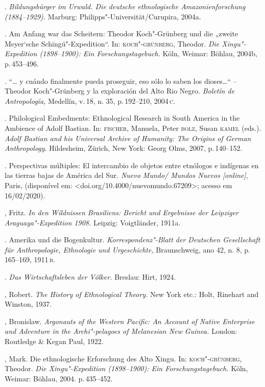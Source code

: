 \begin{bibliohedra}
 \titidem. \textit{Bildungsbürger im Urwald. Die deutsche
 ethnologische Amazonienforschung (1884--1929).} Marburg:
 Philipps"-Universität/Curupira, 2004a.

 \titidem. Am Anfang war das Scheitern: Theodor Koch"-Grünberg
 und die „zweite Meyer`sche Schingú"-Expedition``. In: \textsc{koch"-grünberg},
 Theodor. \textit{Die Xingu"-Expedition (1898--1900): Ein
 Forschungstagebuch.} Köln, Weimar: Böhlau, 2004b, p.\,453--496.

 \titidem. ``\ldots{} y cuándo finalmente pueda proseguir, eso
 sólo lo saben los dioses\ldots{}`` -- Theodor Koch"-Grünberg y la
 exploración del Alto Rio Negro. \textit{Boletín de Antropología,}
 Medellín, v.\,18, n. 35, p.\,192--210, 2004\,\textsc{c}.

 \titidem. Philological Embedments: Ethnological Research in
 South America in the Ambience of Adolf Bastian. In: \textsc{fischer}, Manuela,
 Peter \textsc{bolz}, Susan \textsc{kamel} (eds.). \textit{Adolf Bastian and his Universal
 Archive of Humanity: The Origins of German Anthropology}. Hildesheim,
 Zürich, New York: Georg Olms, 2007, p.\,140--152.

 \titidem. Perspectivas múltiples: El intercambio de objetos
 entre etnólogos e indígenas en las tierras bajas de América del Sur.
 \textit{Nuevo Mundo/ Mundos Nuevos {[}online{]}}, Paris, (disponível
 em: \textless{}doi.org/10.4000/nuevomundo.67209\textgreater{}; acesso em
 16/02/2020).

 , Fritz. \textit{In den Wildnissen Brasiliens: Bericht und
 Ergebnisse der Leipziger Araguaya"-Expedition 1908.} Leipzig:
 Voigtländer, 1911a.

 \titidem. Amerika und die Bogenkultur.
 \textit{Korrespondenz"-Blatt der Deutschen Gesellschaft für
 Anthropologie, Ethnologie und Urgeschichte,} Braunschweig, ano 42, n.
 8, p.\,165--169, 1911\,\textsc{b}.

 \titidem. \textit{Das Wirtschaftsleben der Völker.} Breslau:
 Hirt, 1924.

 , Robert. \textit{The History of Ethnological Theory.} New York
 etc.: Holt, Rinehart and Winston, 1937.

 , Bronislaw. \textit{Argonauts of the Western Pacific: An
 Account of Native Enterprise and Adventure in the Archi"-pelagoes of
 Melanesian New Guinea.} London: Routledge \& Kegan Paul, 1922.

 , Mark. Die ethnologische Erforschung des Alto Xingu. In:
 \textsc{koch"-grünberg}, Theodor. \textit{Die Xingu"-Expedition (1898--1900): Ein
 Forschungstagebuch.} Köln, Weimar: Böhlau, 2004. p.\,435--452.


\end{bibliohedra}

